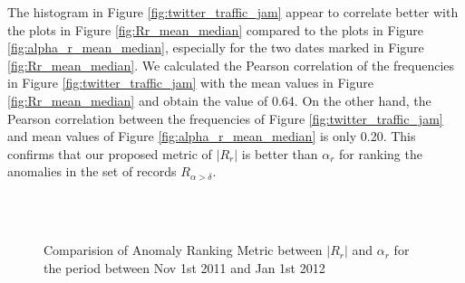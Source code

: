 \documentclass[conference]{IEEEtran.1.8}
\begin{document}
The histogram in Figure \ref{fig:twitter_traffic_jam} appear to correlate better with the plots in Figure \ref{fig:Rr_mean_median} compared to the plots in Figure \ref{fig:alpha_r_mean_median}, especially for the two dates marked in Figure \ref{fig:Rr_mean_median}. We calculated the Pearson correlation of the frequencies in Figure \ref{fig:twitter_traffic_jam} with the mean values in Figure \ref{fig:Rr_mean_median} and obtain the value of 0.64. On the other hand, the Pearson correlation between the frequencies of Figure \ref{fig:twitter_traffic_jam} and mean values of Figure \ref{fig:alpha_r_mean_median} is only 0.20. This confirms that our proposed metric of $|R_r|$ is better than $\alpha_r$ for ranking the anomalies in the set of records $R_{\alpha > \delta}$.
\begin{figure}[htb]
	\centering
	\\
	\\
	\caption{Comparision of Anomaly Ranking Metric between $|R_r|$ and $\alpha_r$ for the period between Nov 1st 2011 and Jan 1st 2012}
	\label{fig:Rr_vs_alpha_r}
\end{figure}
\end{document}
